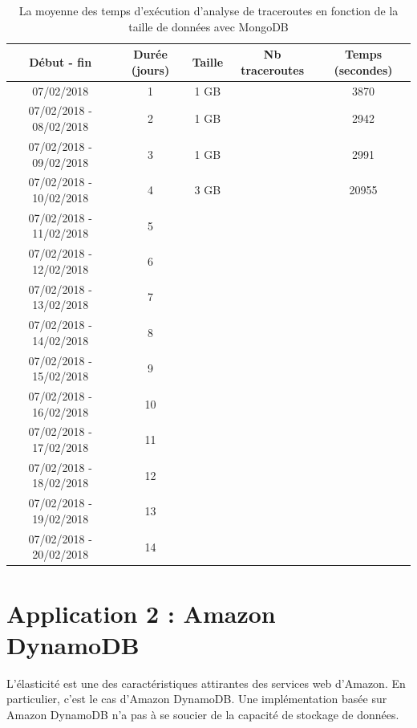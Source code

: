 \begin{table}[H]
	
	\captionsetup{justification=centering}
	\begin{tabular}{ccccc}
		\textbf{Début - fin} &\textbf{Durée (jours)}  & \textbf{Taille}  & \textbf{Nb traceroutes} & \textbf{Temps (secondes)} \\ \hline
		
		07/02/2018             &1 &1 GB&& 3870\\ \hline
		07/02/2018 - 08/02/2018&2 &1 GB&& 2942\\ \hline
		07/02/2018 - 09/02/2018&3 & 1 GB&& 2991\\ \hline
		07/02/2018 - 10/02/2018&4 & 3 GB&& 20955\\ \hline
		07/02/2018 - 11/02/2018&5& && \\ \hline
		07/02/2018 - 12/02/2018&6& && \\ \hline
		07/02/2018 - 13/02/2018&7& && \\ \hline
		07/02/2018 - 14/02/2018&8& && \\ \hline
	    07/02/2018 - 15/02/2018&9& && \\ \hline
	    07/02/2018 - 16/02/2018&10& && \\ \hline
	    07/02/2018 - 17/02/2018&11& && \\ \hline
	    07/02/2018 - 18/02/2018&12& && \\ \hline
	    07/02/2018 - 19/02/2018&13& && \\ \hline
	    07/02/2018 - 20/02/2018&14& && \\ \hline
	\end{tabular}
	\caption{La moyenne des temps d'exécution d'analyse de traceroutes en fonction de la taille de données avec MongoDB}
	\label{tab:mongotiming-timing}
\end{table}


\section{Application 2 : Amazon DynamoDB}




L'élasticité est une des caractéristiques attirantes des services web d'Amazon. En particulier, c'est le cas d'Amazon DynamoDB. Une implémentation basée sur Amazon DynamoDB  n'a pas à se soucier de la capacité  de stockage de données.

